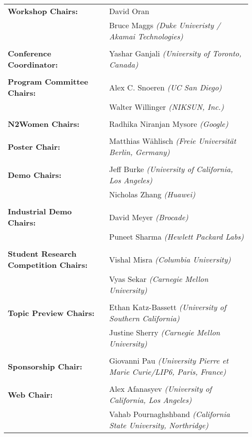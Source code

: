 \documentclass[11pt]{article}
\begin{document}
\begin{supertabular}{L{5cm} L{11cm}}
\textbf{Workshop Chairs:}
 & David Oran \\
 & Bruce Maggs \emph{(Duke Univeristy / Akamai Technologies)} \\
\\

\textbf{Conference Coordinator:}
 & Yashar Ganjali \emph{(University of Toronto, Canada)} \\
\\

\textbf{Program Committee Chairs:}
 & Alex C. Snoeren \emph{(UC San Diego)} \\
 & Walter Willinger \emph{(NIKSUN, Inc.)} \\
\\

\textbf{N2Women Chairs:}
 & Radhika Niranjan Mysore \emph{(Google)} \\
\\

\textbf{Poster Chair:}
 & Matthias Wählisch \emph{(Freie Universität Berlin, Germany)} \\
\\

\textbf{Demo Chairs:}
 & Jeff Burke \emph{(University of California, Los Angeles)} \\
 & Nicholas Zhang \emph{(Huawei)} \\
\\

\textbf{Industrial Demo Chairs:}
 & David Meyer \emph{(Brocade)} \\
 & Puneet Sharma \emph{(Hewlett Packard Labs)} \\
\\

\textbf{Student Research Competition Chairs:}
 & Vishal Misra \emph{(Columbia University)} \\
 & Vyas Sekar \emph{(Carnegie Mellon University)} \\
\\

\textbf{Topic Preview Chairs:}
 & Ethan Katz-Bassett \emph{(University of Southern California)} \\
 & Justine Sherry \emph{(Carnegie Mellon University)} \\
\\

\textbf{Sponsorship Chair:}
 & Giovanni Pau \emph{(University Pierre et Marie Curie/LIP6, Paris, France)} \\
\\

\textbf{Web Chair:}
 & Alex Afanasyev \emph{(University of California, Los Angeles)} \\
 & Vahab Pournaghshband \emph{(California State University, Northridge)} \\

\end{supertabular}
\end{document}
